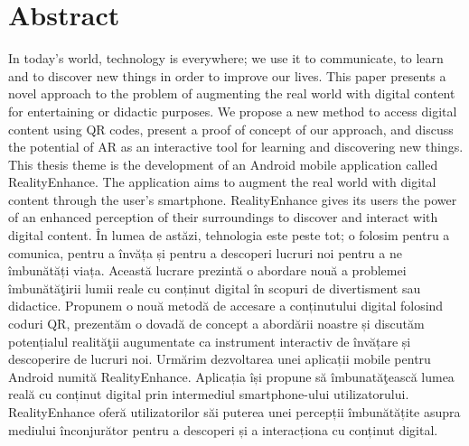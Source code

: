 \section*{Abstract}
In today's world, technology is everywhere; we use it to communicate, to learn and to discover new things in order to improve our lives.
This paper presents a novel approach to the problem of augmenting the real world with digital content for entertaining or didactic purposes. We propose a new method to access digital content using \ac{QR} codes, present a proof of concept of our approach, and discuss the potential of \ac{AR} as an interactive tool for learning and discovering new things.
This thesis theme is the development of an Android mobile application called RealityEnhance. The application aims to augment the real world with digital content through the user's smartphone. RealityEnhance gives its users the power of an enhanced perception of their surroundings to discover and interact with digital content.
\newline
\newline
În lumea de astăzi, tehnologia este peste tot; o folosim pentru a comunica, pentru a învăța și pentru a descoperi lucruri noi pentru a ne îmbunătăți viața.
Această lucrare prezintă o abordare nouă a problemei îmbunătăţirii lumii reale cu conținut digital în scopuri de divertisment sau didactice. Propunem o nouă metodă de accesare a conținutului digital folosind coduri \ac{QR}, prezentăm o dovadă de concept a abordării noastre și discutăm potențialul realităţii augumentate ca instrument interactiv de învățare și descoperire de lucruri noi.
Urmărim dezvoltarea unei aplicații mobile pentru Android numită RealityEnhance. Aplicația își propune să îmbunatăţească lumea reală cu conținut digital prin intermediul smartphone-ului utilizatorului. RealityEnhance oferă utilizatorilor săi puterea unei percepții îmbunătățite asupra mediului înconjurător pentru a descoperi și a interacționa cu conținut digital.